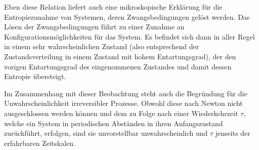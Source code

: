 \begin{summary}
    Eben diese Relation liefert auch eine mikroskopische Erklärung für die Entropiezunahme von Systemen, deren Zwangsbedingungen gelöst werden. Das Lösen der Zwangsbedingungen führt zu einer Zunahme an Konfigurationsmöglichkeiten für das System. Es befindet sich dann in aller Regel in einem sehr wahrscheinlichen Zustand (also entsprechend der Zustandsverteilung in einem Zustand mit hohem Entartungsgrad), der den vorigen Entartungsgrad des eingenommenen Zustandes und damit dessen Entropie übersteigt.

    Im Zusammenhang mit dieser Beobachtung steht auch die Begründung für die Unwahrscheinlichkeit irreversibler Prozesse. Obwohl diese nach Newton nicht ausgeschlossen werden können und dem  zu Folge nach einer Wiederkehrzeit $\tau$, welche ein System in periodischen Abständen in ihren Anfangszustand zurückführt, erfolgen, sind sie unvorstellbar unwahrscheinlich und $\tau$ jenseits der erfahrbaren Zeitskalen.
\end{summary}
